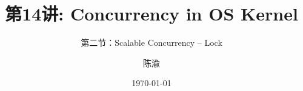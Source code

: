 


\title[第14讲]{第14讲: Concurrency in OS Kernel} %
\subtitle{第二节：Scalable Concurrency -- Lock}
\author{陈渝} %
\date{\today} %





\begin{frame}
\titlepage %
\end{frame}
    
%
%

